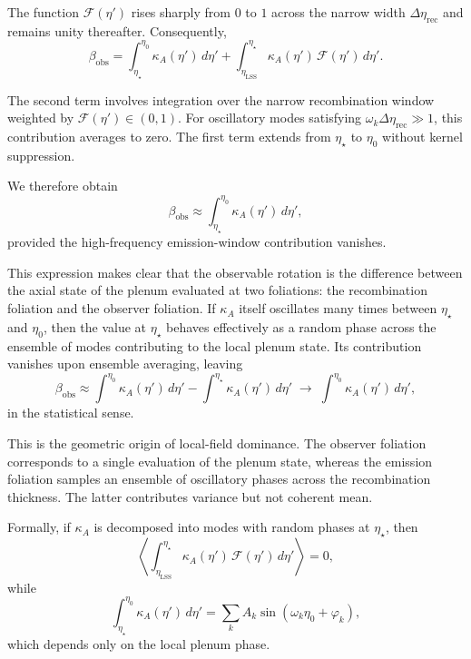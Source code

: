 \documentclass[12pt]{article}
\begin{document}
The function $\mathcal{F}(\eta')$ rises sharply from $0$ to $1$ across the narrow width $\Delta\eta_{\mathrm{rec}}$ and remains unity thereafter. Consequently,
\begin{equation}
\beta_{\mathrm{obs}}
=
\int_{\eta_\star}^{\eta_0}
\kappa_A(\eta')\, d\eta'
+
\int_{\eta_{\mathrm{LSS}}}^{\eta_\star}
\kappa_A(\eta')\, \mathcal{F}(\eta')\, d\eta'.
\end{equation}

The second term involves integration over the narrow recombination window weighted by $\mathcal{F}(\eta') \in (0,1)$. For oscillatory modes satisfying $\omega_k \Delta\eta_{\mathrm{rec}} \gg 1$, this contribution averages to zero. The first term extends from $\eta_\star$ to $\eta_0$ without kernel suppression.

We therefore obtain
\begin{equation}
\beta_{\mathrm{obs}}
\approx
\int_{\eta_\star}^{\eta_0}
\kappa_A(\eta')\, d\eta',
\end{equation}
provided the high-frequency emission-window contribution vanishes.

This expression makes clear that the observable rotation is the difference between the axial state of the plenum evaluated at two foliations: the recombination foliation and the observer foliation. If $\kappa_A$ itself oscillates many times between $\eta_\star$ and $\eta_0$, then the value at $\eta_\star$ behaves effectively as a random phase across the ensemble of modes contributing to the local plenum state. Its contribution vanishes upon ensemble averaging, leaving
\begin{equation}
\beta_{\mathrm{obs}}
\approx
\int^{\eta_0} \kappa_A(\eta')\, d\eta'
-
\int^{\eta_\star} \kappa_A(\eta')\, d\eta'
\;\longrightarrow\;
\int^{\eta_0} \kappa_A(\eta')\, d\eta',
\end{equation}
in the statistical sense.

This is the geometric origin of local-field dominance. The observer foliation corresponds to a single evaluation of the plenum state, whereas the emission foliation samples an ensemble of oscillatory phases across the recombination thickness. The latter contributes variance but not coherent mean.

Formally, if $\kappa_A$ is decomposed into modes with random phases at $\eta_\star$, then
\begin{equation}
\left\langle
\int_{\eta_{\mathrm{LSS}}}^{\eta_\star}
\kappa_A(\eta')\, \mathcal{F}(\eta')\, d\eta'
\right\rangle
=
0,
\end{equation}
while
\begin{equation}
\int_{\eta_\star}^{\eta_0}
\kappa_A(\eta')\, d\eta'
=
\sum_k
A_k
\sin(\omega_k \eta_0 + \varphi_k),
\end{equation}
which depends only on the local plenum phase.
\end{document}
